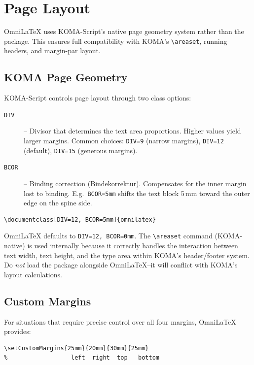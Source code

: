 \chapter{Page Layout}
\label{ch:page-layout}

OmniLaTeX uses KOMA-Script's native page geometry system rather than the
 package.  This ensures full compatibility with KOMA's
\verb|\areaset|, running headers, and margin-par layout.

\section{KOMA Page Geometry}

KOMA-Script controls page layout through two class options:

\begin{description}
  \item[{\texttt{DIV}}] -- Divisor that determines the text area proportions.
        Higher values yield larger margins.  Common choices: \texttt{DIV=9}
        (narrow margins), \texttt{DIV=12} (default), \texttt{DIV=15}
        (generous margins).
  \item[{\texttt{BCOR}}] -- Binding correction (Bindekorrektur).  Compensates
        for the inner margin lost to binding.  E.g.\ \texttt{BCOR=5mm} shifts
        the text block 5\,mm toward the outer edge on the spine side.
\end{description}

\begin{verbatim}
\documentclass[DIV=12, BCOR=5mm]{omnilatex}
\end{verbatim}

OmniLaTeX defaults to \texttt{DIV=12, BCOR=0mm}.  The \verb|\areaset|
command (KOMA-native) is used internally because it correctly handles the
interaction between text width, text height, and the type area within
KOMA's header/footer system.  Do \emph{not} load the 
package alongside OmniLaTeX--it will conflict with KOMA's layout
calculations.

\section{Custom Margins}

For situations that require precise control over all four margins,
OmniLaTeX provides:

\begin{verbatim}
\setCustomMargins{25mm}{20mm}{30mm}{25mm}
%                  left  right  top   bottom
\end{verbatim}

